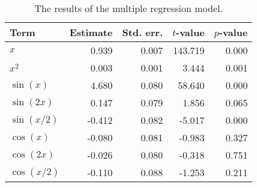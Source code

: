 \begin{table}[t]

\caption{\label{tab:multiple-regression}The results of the multiple regression model.}
\centering
\begin{tabular}{lrrrr}
\toprule
Term & Estimate & Std. err. & \(t\)-value & \(p\)-value\\
\midrule
\(x\) & 0.939 & 0.007 & 143.719 & 0.000\\
\(x^2\) & 0.003 & 0.001 & 3.444 & 0.001\\
\(\sin(x)\) & 4.680 & 0.080 & 58.640 & 0.000\\
\(\sin(2x)\) & 0.147 & 0.079 & 1.856 & 0.065\\
\(\sin(x/2)\) & -0.412 & 0.082 & -5.017 & 0.000\\
\(\cos(x)\) & -0.080 & 0.081 & -0.983 & 0.327\\
\(\cos(2x)\) & -0.026 & 0.080 & -0.318 & 0.751\\
\(\cos(x/2)\) & -0.110 & 0.088 & -1.253 & 0.211\\
\bottomrule
\end{tabular}
\end{table}